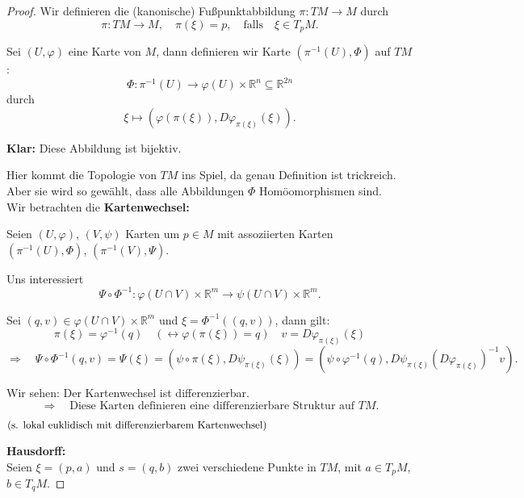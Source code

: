 \documentclass[fleqn, 12pt, letterpaper]{article}
\begin{document}
\begin{proof}
    Wir definieren die (kanonische) Fußpunktabbildung \(\pi: TM \to M\) durch
\[
\pi: TM \to M, \quad \pi(\xi) = p, \quad \text{falls} \quad \xi \in T_pM.
\]

Sei \((U, \varphi)\) eine Karte von \(M\), dann definieren wir Karte $(\pi^{-1}(U), \Phi)$ auf $TM$:
\[
\Phi: \pi^{-1}(U) \to \varphi(U) \times \mathbb{R}^n \subseteq \mathbb{R}^{2n}
\]
durch
\[
\xi \mapsto (\varphi(\pi(\xi)), D\varphi_{\pi(\xi)}(\xi)).
\]

\vspace{1em}

\textbf{Klar:} Diese Abbildung ist bijektiv.

\vspace{0.5em}

Hier kommt die Topologie von \(TM\) ins Spiel, da genau Definition ist trickreich. Aber sie wird so gewählt, dass alle Abbildungen \(\Phi\) Homöomorphismen sind.\\

Wir betrachten die \textbf{Kartenwechsel:}

Seien \((U, \varphi)\), \((V, \psi)\) Karten um \(p \in M\) mit assoziierten Karten \((\pi^{-1}(U), \Phi)\), \((\pi^{-1}(V), \Psi)\).

Uns interessiert
\[
\Psi \circ \Phi^{-1}: \varphi(U \cap V) \times \mathbb{R}^m \longrightarrow \psi(U \cap V) \times \mathbb{R}^m
.
\]

Sei \((q, v) \in \varphi(U \cap V) \times \mathbb{R}^m\) und \(\xi = \Phi^{-1}((q, v))\), dann gilt:
\[
\pi(\xi)= \varphi^{-1}(q)  \quad (\leftrightarrow \varphi(\pi(\xi))=q) \quad v=D\varphi_{\pi(\xi)}(\xi)
\]
\[
\Rightarrow \quad \Psi \circ \Phi^{-1}(q, v) = \Psi(\xi) = \left( \psi \circ \pi(\xi), D\psi_{\pi(\xi)}(\xi) \right)
= \left( \psi\circ\varphi^{-1}(q), D\psi_{\pi(\xi)} (D\varphi_{\pi(\xi)} )^{-1} v\right).
\]

\vspace{1em}

Wir sehen: Der Kartenwechsel ist differenzierbar.
\[
\Rightarrow \quad \text{Diese Karten definieren eine differenzierbare Struktur auf } TM.
\]

\vspace{1em}

\hfill \(\text{\small{(s. lokal euklidisch mit differenzierbarem Kartenwechsel)}}\)

\textbf{Hausdorff:} \\
Seien \(\xi = (p,a)\) und \(s = (q,b)\) zwei verschiedene Punkte in \(TM\), mit \(a \in T_p M\), \(b \in T_q M\).


\end{proof}
\end{document}
